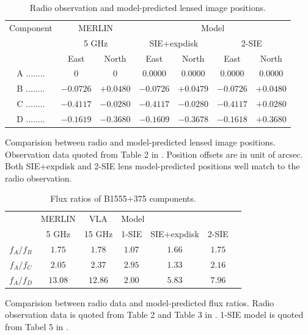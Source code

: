 \documentclass[useAMS,usenatbib]{mn2e}
\begin{document}
\begin{table}
 \begin{minipage}{140mm}
  \caption{Radio observation and model-predicted lensed image positions.}
  \begin{tabular}{@{}ccccccc}

\hline

Component	&\multicolumn{2}{c}{MERLIN} 	 & \multicolumn{4}{c}{Model} \\
					&\multicolumn{2}{c}{5 GHz}		&	\multicolumn{2}{c}{SIE+expdisk} &\multicolumn{2}{c}{ 2-SIE}		\\
					 &East &North &East 		&North &East 		&North\\ 
\hline
A ........ &$0$    		&$0$		&$0.0000$ &$0.0000$   &   $0.0000$   &  $ 0.0000$\\  
B ........ &$-0.0726$ 	&$+0.0480$	&$-0.0726$ &$+0.0479$ & $-0.0726 $  &  $+0.0480$  \\  
C ........ &$-0.4117$  &$-0.0280$	&$-0.4117$ &$-0.0280$  & $-0.4117 $  &   $+0.0280$ \\  
D ........ &$-0.1619$  &$-0.3680$	&$-0.1609$ &$-0.3678$  & $-0.1618$    &  $+0.3680$ \\  
\hline
\end{tabular}

\end{minipage}
\medskip

Comparision between radio and model-predicted lensed image positions. Observation data quoted from Table 2 in \citet{Marlow}. Position offsets are in unit of arcsec. Both SIE+expdisk and 2-SIE lens model-predicted positions well match to the radio observation.

\end{table}

\begin{table}
  \caption{Flux ratios of B1555+375 components.}
  \begin{tabular}{@{}ccccccc}

\hline
	& MERLIN & VLA & \multicolumn{3}{l}{Model}\\
		&5 GHz & 15 GHz  & 1-SIE & SIE+expdisk & 2-SIE\\
\hline
$f_A/f_B$			&$1.75$ & $1.78$ &$1.07$& $1.66$ & $1.75$ \\ 
$f_A/f_C$		&$2.05$ 	&$2.37$ &$2.95$ & $1.33$ & $2.16$\\
$f_A/f_D$		&$13.08$ &$ 12.86$ &$2.00$& $5.83$ & $7.96$\\

\hline
\end{tabular}

\medskip
Comparision between radio data and model-predicted flux ratios. Radio observation data is quoted from Table 2 and Table 3 in \citet{Marlow}. 1-SIE model is quoted from Tabel 5 in \citet{Marlow}.

\end{table}
\end{document}
